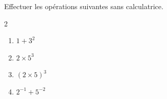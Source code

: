 \begin{exo}{}
	Effectuer les opérations suivantes sans calculatrice.
	\vspace*{-2mm}\begin{multicols}{2}
	\begin{enumerate}[itemsep=2mm]
		\item $1 + 3^2$
		\item $2 \times 5^3$
		\item $(2 \times 5)^3$
		\item $2^{-1} + 5^{-2}$
	\end{enumerate}
	\end{multicols}
\end{exo}
